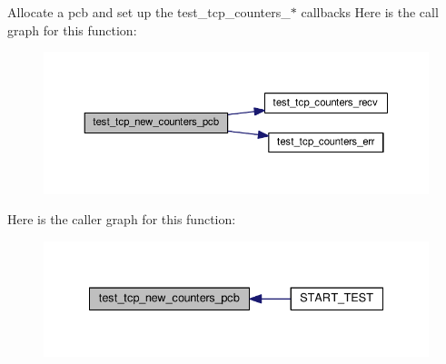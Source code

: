 Allocate a pcb and set up the test\+\_\+tcp\+\_\+counters\+\_\+$\ast$ callbacks Here is the call graph for this function\+:
\nopagebreak
\begin{figure}[H]
\begin{center}
\leavevmode
\includegraphics[width=350pt]{openmote-cc2538_2lwip_2test_2unit_2tcp_2tcp__helper_8h_a4743f4d8687063a2fc6da6d448cfcdcf_cgraph}
\end{center}
\end{figure}
Here is the caller graph for this function\+:
\nopagebreak
\begin{figure}[H]
\begin{center}
\leavevmode
\includegraphics[width=335pt]{openmote-cc2538_2lwip_2test_2unit_2tcp_2tcp__helper_8h_a4743f4d8687063a2fc6da6d448cfcdcf_icgraph}
\end{center}
\end{figure}
